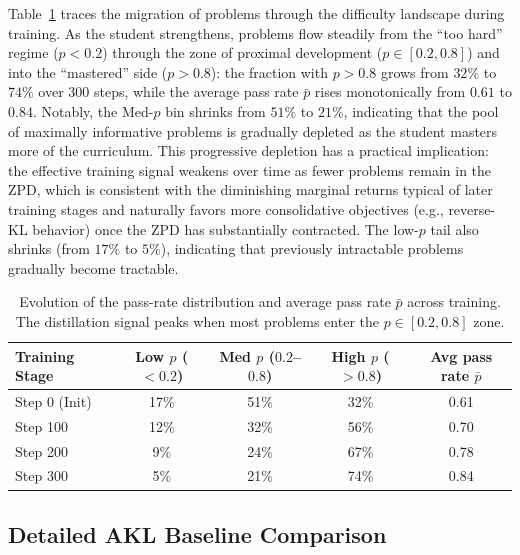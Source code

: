 \documentclass{article}
\begin{document}
Table~\ref{tab:passrate_evolution} traces the migration of problems through the difficulty landscape during training.
As the student strengthens, problems flow steadily from the ``too hard'' regime ($p<0.2$) through the zone of proximal development ($p\in[0.2,0.8]$) and into the ``mastered'' side ($p>0.8$): the fraction with $p>0.8$ grows from $32\%$ to $74\%$ over 300 steps, while the average pass rate $\bar p$ rises monotonically from $0.61$ to $0.84$.
Notably, the Med-$p$ bin shrinks from $51\%$ to $21\%$, indicating that the pool of maximally informative problems is gradually depleted as the student masters more of the curriculum.
This progressive depletion has a practical implication: the effective training signal weakens over time as fewer problems remain in the ZPD, which is consistent with the diminishing marginal returns typical of later training stages and naturally favors more consolidative objectives (e.g., reverse-KL behavior) once the ZPD has substantially contracted.
The low-$p$ tail also shrinks (from $17\%$ to $5\%$), indicating that previously intractable problems gradually become tractable.

\begin{table}[h]
\caption{Evolution of the pass-rate distribution and average pass rate $\bar p$ across training. The distillation signal peaks when most problems enter the $p\in[0.2,0.8]$ zone.}
\centering
\begin{tabular}{l|cccc}
\toprule
\textbf{Training Stage} & Low $p$ ($<\!0.2$) & Med $p$ ($0.2$--$0.8$) & High $p$ ($>\!0.8$) & Avg pass rate $\bar p$ \\
\midrule
Step 0 (Init) & 17\% & 51\% & 32\% & 0.61 \\
Step 100     & 12\% & 32\% & 56\% & 0.70 \\
Step 200     & 9\% & 24\% & 67\% & 0.78 \\
Step 300 & 5\% & 21\% & 74\% & 0.84 \\
\bottomrule
\end{tabular}
\label{tab:passrate_evolution}
\end{table}

\subsection{Detailed AKL Baseline Comparison}
\label{app:akl_analysis}
\end{document}
